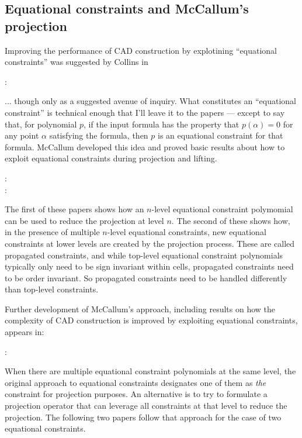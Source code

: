 \documentclass{article}
\begin{document}
\subsection{Equational constraints and McCallum's projection}
Improving the performance of CAD construction by explotining
``equational constraints'' was suggested by Collins in
%
\begin{description}
\item[\autocite{Collins:94} :]  
\end{description}
%
... though only as a suggested avenue of inquiry. What constitutes an
``equational constraint'' is technical enough that I'll leave it to
the papers --- except to say that, for polynomial $p$,  if the input formula has the
property that $p(\alpha) = 0$ for any point $\alpha$ satisfying the
formula, then $p$ is an equational constraint for that formula.
McCallum developed this idea
and proved basic results about how to exploit equational constraints
during projection and lifting.
%
\begin{description}
\item[\autocite{McCallum:99} :]  
\item[\autocite{McCallum:01} :]  
\end{description}
%
The first of these papers shows how an $n$-level equational constraint
polymomial can be used to reduce the projection at level $n$.
The second of these shows how, in the presence of multiple
$n$-level equational constraints, new equational constraints at lower
levels are created by the projection process.  These are called
propagated constraints, and while top-level equational constraint
polynomials typically only need to be sign invariant within cells,
propagated constraints need to be order invariant.  So propagated
constraints need to be handled differently than top-level constraints. 

Further development of McCallum's  approach, including results on
how the complexity of CAD construction is improved by exploiting
equational constraints, appears in:
%
\begin{description}
\item[\autocite{EnglandEtAl:2020} :]  
\end{description}
%

When there are multiple equational constraint polynomials at the same
level, the original approach to equational constraints designates one
of them as \emph{the} constraint for projection purposes.  An
alternative is to try to formulate a projection operator that can
leverage all constraints at that level to reduce the projection.
The following two papers follow that approach for the case of two
equational constraints.
\end{document}
